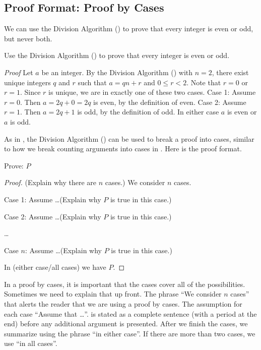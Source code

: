 \newcommand{\subpffcases}{Proof Format: Proof by Cases}
\subsection{\subpffcases}
\label{sub_pff_cases}

We can use the Division Algorithm () to prove that every integer is even or odd, but never both.

\begin{exam}
\label{exam_every_integer_even_or_odd}
    Use the Division Algorithm () to prove that every integer is even or odd.
    \begin{soln}
        \emph{Proof}  Let $a$ be an integer.  By the Division Algorithm () with $n=2$, there exist unique integers $q$ and $r$ such that $a=qn+r$ and $0 \le r < 2$.  Note that $r=0$ or $r=1$.  Since $r$ is unique, we are in exactly one of these two cases.
        Case 1: Assume $r=0$.  Then $a = 2q+0 = 2q$ is even, by the definition of even.
        Case 2: Assume $r=1$. Then $a=2q+1$ is odd, by the definition of odd.  In either case $a$ is even or $a$ is odd. 
    \end{soln}
\end{exam}

As in , the Division Algorithm () can be used to break a proof into cases, similar to how we break counting arguments into cases in .  Here is the proof format.

\begin{pff} 
\label{pff_cases} 
Prove: $P$
    \begin{proof}
        (Explain why there are $n$ cases.) We consider $n$ cases.
  
        Case 1: Assume \ldots (Explain why $P$ is true in this case.) 
        
        Case 2: Assume \ldots (Explain why $P$ is true in this case.) 
        
        \ldots

        Case $n$: Assume \ldots (Explain why $P$ is true in this case.) 
        
        In (either case/all cases) we have $P$. 
\end{proof}
\end{pff}

In a proof by cases, it is important that the cases cover all of the possibilities.  Sometimes we need to explain that up front.  The phrase ``We consider $n$ cases'' that alerts the reader that we are using a proof by cases.  The assumption for each case ``Assume that \ldots''.  is stated as a complete sentence (with a period at the end) before any additional argument is presented.  After we finish the cases, we summarize using the phrase ``in either case''.  If there are more than two cases, we use ``in all cases''.

